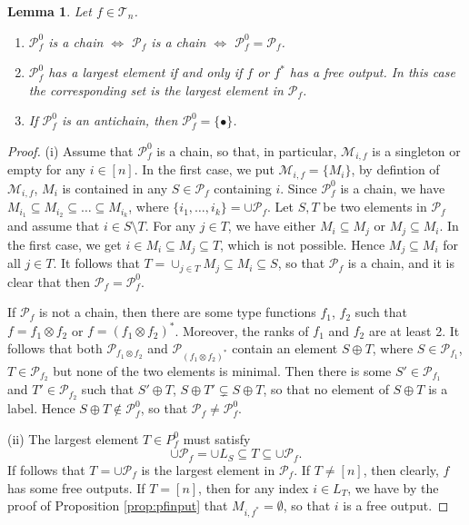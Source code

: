 \documentclass[12pt]{article}
\newtheorem{lemma}{Lemma}
\theoremstyle{definition}
\theoremstyle{remark}
\def\Me{\mathcal M}
\def\Te{\mathcal T}
\def\Pe{\mathcal P}
\begin{document}
\begin{lemma}\label{lemma:p0_basic} Let $f\in \Te_n$.
\begin{enumerate}
\item[(i)] $\Pe_f^0$ is a chain $\iff$  $\Pe_f$ is a chain $\iff$  $\Pe_f^0= \Pe_f$.

\item[(ii)] $\Pe^0_f$ has a largest element if and only if $f$ or $f^*$ has a free
output. In this case  the corresponding set is the largest element in $\Pe_f$. 

\item[(iii)] If $\Pe_f^0$ is an antichain, then $\Pe_f^0=\{\bullet\}$. 

\end{enumerate}
\end{lemma}


\begin{proof} 
(i) Assume that $\Pe^0_f$ is a chain, so that, in particular,
 $\Me_{i,f}$ is a singleton or empty for any $i\in [n]$. In the first case, we put
 $\Me_{i,f}=\{M_i\}$, by defintion of $\Me_{i,f}$, $M_i$ is contained in any $S\in \Pe_f$ containing $i$.
Since
$\Pe^0_f$ is a chain, we have $M_{i_1}\subseteq M_{i_2}\subseteq\dots\subseteq M_{i_k}$,
where $\{i_1,\dots,i_k\}=\cup \Pe_f$.  Let $S,T$ be two
elements in $\Pe_f$ and assume that $i\in S\setminus T$. For any $j\in T$, we have either
$M_i\subseteq M_j$ or $M_j\subseteq M_i$. In the first case, we get $i\in M_i\subseteq
M_j\subseteq T$, which is not possible. Hence $M_j\subseteq M_i$ for all $j\in T$. It
follows that $T=\cup_{j\in T} M_j\subseteq M_i\subseteq S$, so that $\Pe_f$ is a chain,
and it is clear that then $\Pe_f=\Pe_f^0$. 

If $\Pe_f$ is not a chain, then there are some type
functions
$f_1$, $f_2$ such that $f=f_1\otimes f_2$ or $f=(f_1\otimes f_2)^*$. Moreover, the ranks
of $f_1$ and $f_2$ are at least 2. It follows that both $\Pe_{f_1\otimes f_2}$ and
$\Pe_{(f_1\otimes f_2)^*}$ contain an element $S\oplus T$, where $S\in \Pe_{f_1}$, $T\in
\Pe_{f_2}$ but none of the two elements is minimal. Then there is some $S'\in \Pe_{f_1}$
and $T'\in \Pe_{f_2}$ such that $S'\oplus T$, $S\oplus T'\subsetneq S\oplus T$, so that no
element of $S\oplus T$ is a label. Hence
$S\oplus T\notin
\Pe_f^0$, so that $\Pe_f\ne \Pe_f^0$. 

(ii) The largest element  $T\in P^0_f$ must satisfy 
\[
\cup\Pe_f=\cup L_S \subseteq T\subseteq \cup \Pe_f.
\]
 If follows that $T=\cup\Pe_f $ is the largest element in $\Pe_f$. If $T\ne [n]$, then
 clearly, $f$ has some free outputs. If $T=[n]$, then for any index $i\in L_T$, we have by
 the proof of Proposition \ref{prop:pfinput} that
 $M_{i,f^*}=\emptyset$, so that $i$ is a free output. 



\end{proof}
\end{document}
